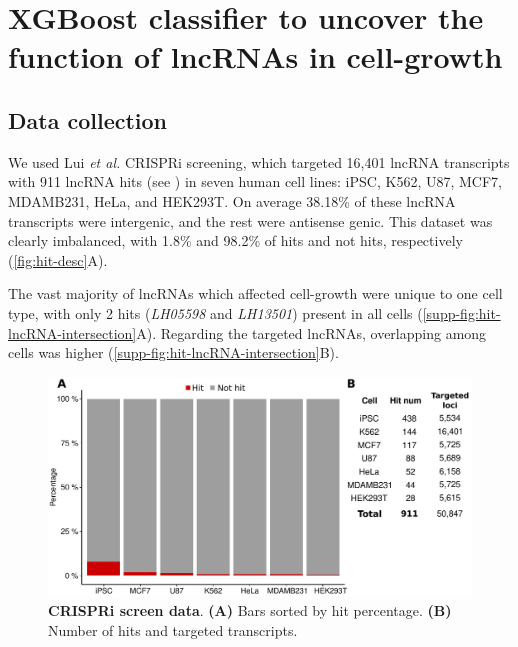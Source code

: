 \section[XGBoost classifier to uncover the function of lncRNAs in cell-growth]{XGBoost classifier to uncover the function of lncRNAs in cell-growth}
\label{sec:ML  model for classification of functional lncRNAs}

\subsection{Data collection}
\label{sec:data-collection}

We used Lui \textit{et al.} CRISPRi screening,\autocite{liu_2017_crispri} which targeted 16,401 lncRNA transcripts with 911 lncRNA hits (see )  in seven human cell lines: iPSC, K562, U87, MCF7, MDAMB231, HeLa, and HEK293T. On average 38.18\% of these lncRNA transcripts were intergenic, and the rest were antisense genic. This dataset was clearly imbalanced, with 1.8\% and 98.2\% of hits and not hits, respectively (\autoref{fig:hit-desc}A).

The vast majority of lncRNAs which affected cell-growth were unique to one cell type,\autocite{liu_2017_crispri} with only 2 hits (\textit{LH05598} and \textit{LH13501}) present in all cells (\autoref{supp-fig:hit-lncRNA-intersection}A). Regarding the targeted lncRNAs, overlapping among cells was higher (\autoref{supp-fig:hit-lncRNA-intersection}B).

\begin{figure}[ht!]
  \centering
  \includegraphics[scale=0.55]{plots/results/ml/hit.description.pdf}
  \caption[CRISPRi screen data]{\textbf{CRISPRi screen data}. \textbf{(A)} Bars sorted by hit percentage. \textbf{(B)} Number of hits and targeted transcripts.}
  \label{fig:hit-desc}
\end{figure}

